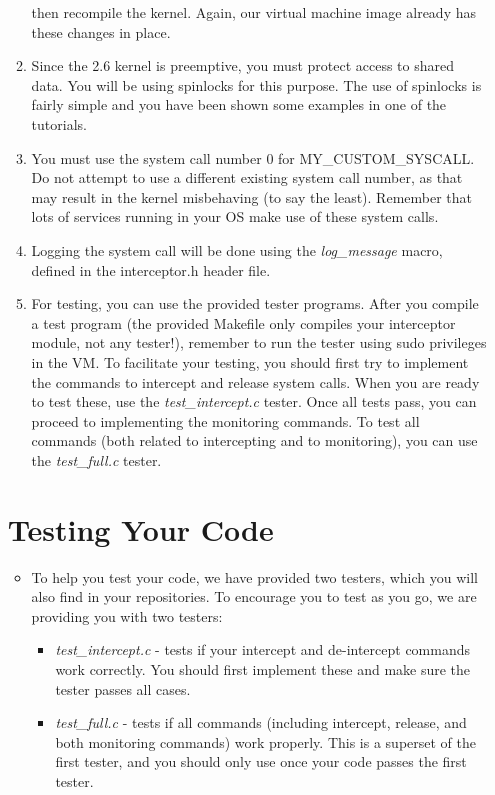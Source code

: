 \documentclass[12pt]{article}
\begin{document}
\begin{itemize}
\begin{enumerate}[1.]
    then recompile the kernel. Again, our virtual machine image already has these changes in place.
    \item Since the 2.6 kernel is preemptive, you must protect access to shared data. You will be using spinlocks for this purpose. The use of spinlocks is fairly simple and you have been shown some examples in one of the tutorials.
    \item You must use the system call number 0 for MY\_CUSTOM\_SYSCALL. Do not attempt to use a different existing system call number, as that may result in the kernel misbehaving (to say the least). Remember that lots of services running in your OS make use of these system calls.
    \item Logging the system call will be done using the \textit{log\_message} macro, defined in the interceptor.h header file.
    \item For testing, you can use the provided tester programs. After you compile a test program (the provided Makefile only compiles your interceptor module, not any tester!), remember to run the tester using sudo privileges in the VM.
    To facilitate your testing, you should first try to implement the commands to intercept and release system calls. When you are ready to test these, use the \textit{test\_intercept.c} tester.
    Once all tests pass, you can proceed to implementing the monitoring commands. To test all commands (both related to intercepting and to monitoring), you can use the \textit{test\_full.c} tester.
    \end{enumerate}

    \bigskip

    \section{Testing Your Code}

    \bigskip

    \begin{itemize}
        \item

        To help you test your code, we have provided two testers, which you will also find in your repositories. To encourage you to test as you go, we are providing you with two testers:

        \begin{itemize}
            \item \textit{test\_intercept.c} - tests if your intercept and de-intercept commands work correctly. You should first implement these and make sure the tester passes all cases.
            \item \textit{test\_full.c} - tests if all commands (including intercept, release, and both monitoring commands) work properly. This is a superset of the first tester, and you should only use once your code passes the first tester.
        \end{itemize}


\end{itemize}
\end{itemize}
\end{document}
